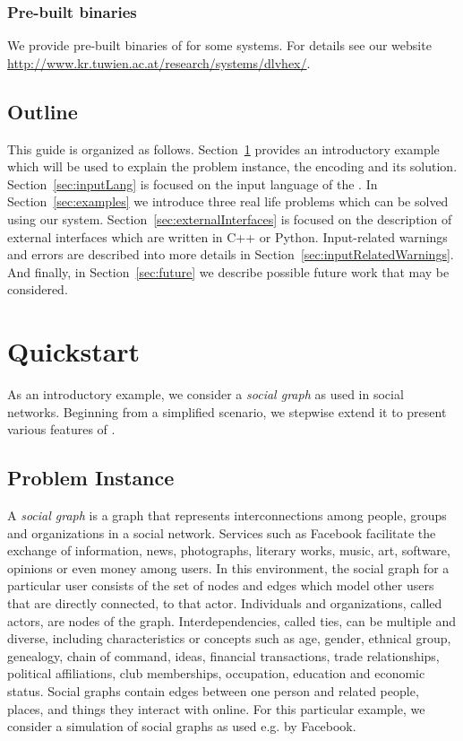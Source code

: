 \documentclass[a4paper, titlepage]{article}
\begin{document}
\subsubsection{Pre-built binaries}
We provide pre-built binaries of \dlvhex{} for some 
systems. For details see our website 
\url{http://www.kr.tuwien.ac.at/research/systems/dlvhex/}. 

\subsection{Outline}
This guide is organized as follows. Section~\ref{sec:quick} 
provides an introductory example which will be used to 
explain the problem instance, the encoding and its 
solution. Section~\ref{sec:inputLang} is focused on the input 
language of the \dlvhex{}. In Section~\ref{sec:examples} we 
introduce three real life problems which can be solved 
using our system. Section~\ref{sec:externalInterfaces} is 
focused on the description of external interfaces which are 
written in C++ or Python. Input-related warnings and errors 
are described into more details in 
Section~\ref{sec:inputRelatedWarnings}. And finally, in 
Section~\ref{sec:future} we describe possible future work 
that may be considered.

\section{Quickstart} %
\label{sec:quick}
As an introductory example, we consider a \emph{social 
graph} as used in social networks. Beginning from a 
simplified scenario, we stepwise extend it to present 
various features of \dlvhex{}.

\subsection{Problem Instance}
A \emph{social graph} is a graph that represents 
interconnections among people, groups 
and organizations in a social network. Services such as 
Facebook facilitate the exchange 
of information, news, photographs, literary works, music, 
art, software, opinions or even 
money among users. In this environment, the social graph 
for a particular user consists 
of the set of nodes and edges which model other users that 
are directly connected, to that actor. 
Individuals and organizations, called actors, are nodes of 
the graph. Interdependencies, 
called ties, can be multiple and diverse, including 
characteristics or concepts such as age, 
gender, ethnical group, genealogy, chain of command, ideas, financial 
transactions, trade relationships, 
political affiliations, club memberships, occupation, 
education and economic status. 
Social graphs contain edges between one person and related 
people, places, and things they interact 
with online. For this particular example, we consider a 
simulation of social graphs as used e.g. by Facebook. 
\end{document}
